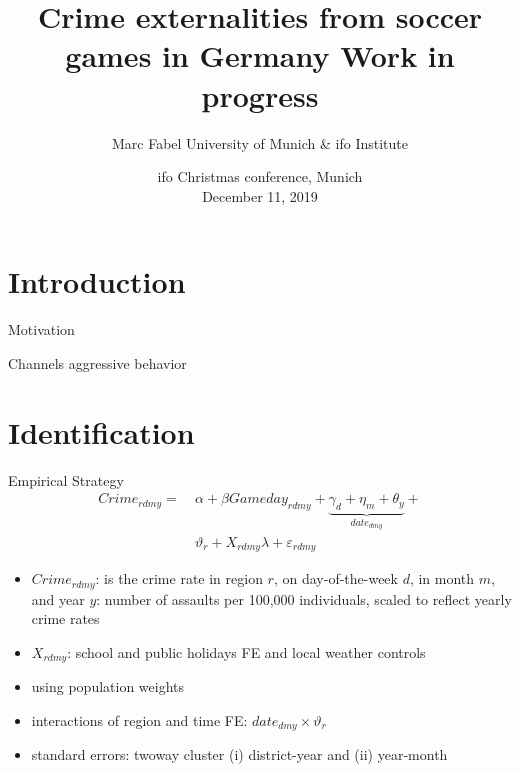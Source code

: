 \documentclass[usenames,dvipsnames]{beamer} %
\title[Soccer and Crime]{  \textbf{Crime externalities from soccer games in Germany }\newline Work in progress}
\author[Marc Fabel]{Marc Fabel \newline University of Munich \& ifo Institute}
\date{ifo Christmas conference, Munich\\December 11, 2019}
\begin{document}
\begin{frame}
	\titlepage
\end{frame}




\section{Introduction}
\begin{frame}{Motivation}
\end{frame}
\begin{frame}{Channels}
	aggressive behavior
\end{frame}



\section{Identification}

	\begin{frame}{Empirical Strategy}
		\begin{align}
			Crime_{rdmy} =\ &\alpha + \beta Gameday_{rdmy} + \underbrace{\gamma_d +  \eta_m + \theta_y}_{date_{dmy}} + \nonumber\\ & \vartheta_r + X_{rdmy} \lambda + \varepsilon_{rdmy}
			\label{eq_soc_ext:model}
		\end{align}
	
		\begin{itemize}
			\item $Crime_{rdmy}$: is the crime rate in region $r$, on day-of-the-week $d$, in month $m$, and year $y$: number of assaults per 100,000 individuals, scaled to reflect yearly crime rates
			\item $ X_{rdmy}$: school and public holidays FE and local weather controls
			\item using population weights
			\item interactions of region and time FE: $date_{dmy}\times\vartheta_r$
			\item standard errors: twoway cluster (i) district-year and (ii) year-month
		\end{itemize}
	\end{frame}
\end{document}
